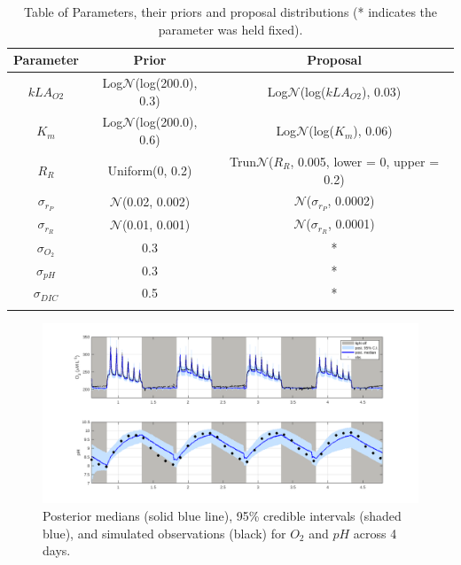 \documentclass{ruthesis}
\begin{document}
\FloatBarrier
\begin{longtable}{|c | c  |  c|}
	\hline
	\bfseries{Parameter} & \bfseries{Prior} &  \bfseries{Proposal} \\ \hline
	$kLA_{O2}$  & Log$\mathcal{N}$(log(200.0), 0.3)  & Log$\mathcal{N}$(log($kLA_{O2}$), 0.03) \\
	$K_m$ 		&  Log$\mathcal{N}$(log(200.0), 0.6) & Log$\mathcal{N}$(log($K_m$), 0.06) \\
	$R_R$  		& Uniform(0, 0.2) &  Trun$\mathcal{N}$($R_R$, 0.005, lower = 0, upper = 0.2) \\
	$\sigma_{r_P}$ & $\mathcal{N}$(0.02, 0.002)   & $\mathcal{N}$($\sigma_{r_P}$, 0.0002)   \\
	$\sigma_{r_R}$ & $\mathcal{N}$(0.01, 0.001)   & $\mathcal{N}$($\sigma_{r_R}$, 0.0001)   \\
	$\sigma_{O_2}$ 	& 0.3 	& * \\
	$\sigma_{pH}$ 	& 0.3 	& * \\
	$\sigma_{DIC}$ 	& 0.5 	& * \\	
	\hline
	\caption[.]{Table of Parameters, their priors and proposal distributions (* indicates the parameter was held fixed).}
	\label{tab:micro_priors_chris}
\end{longtable}



\FloatBarrier
\begin{figure}
	\centerline{\includegraphics[width=1.2\textwidth]{images_microalgae/plots_chris/O2_pH}}
	\caption[.]{Posterior medians (solid blue line), 95\% credible intervals (shaded blue), and simulated observations (black) for $O_2$ and $pH$ across 4 days.}
	\label{fig:micro_exp_O2_pH}
\end{figure}
\end{document}
